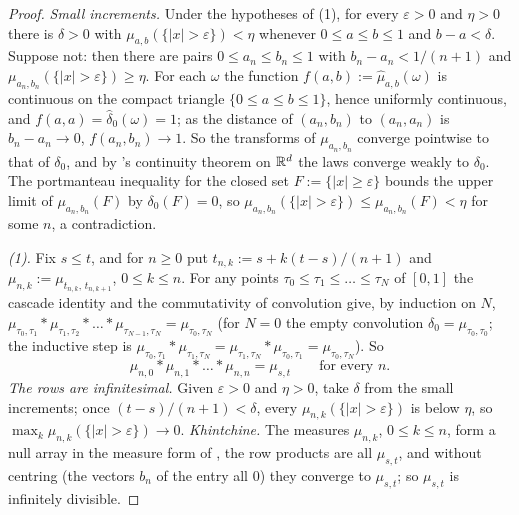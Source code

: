\begin{proof}
\leanok
\emph{Small increments.} Under the hypotheses of (1), for every $\varepsilon > 0$ and $\eta > 0$ there is
$\delta > 0$ with $\mu_{a,b}(\{|x| > \varepsilon\}) < \eta$ whenever $0 \le a \le b \le 1$ and
$b - a < \delta$. Suppose not: then there are pairs $0 \le a_n \le b_n \le 1$ with
$b_n - a_n < 1/(n+1)$ and $\mu_{a_n,b_n}(\{|x| > \varepsilon\}) \ge \eta$. For each $\omega$ the
function $f(a,b) := \widehat\mu_{a,b}(\omega)$ is continuous on the compact triangle
$\{0 \le a \le b \le 1\}$, hence uniformly continuous, and $f(a,a) = \widehat\delta_0(\omega) = 1$;
as the distance of $(a_n, b_n)$ to $(a_n, a_n)$ is $b_n - a_n \to 0$, $f(a_n, b_n) \to 1$. So the
transforms of $\mu_{a_n,b_n}$ converge pointwise to that of $\delta_0$, and by \Levy's continuity
theorem on $\mathbb{R}^d$ the laws converge weakly to $\delta_0$. The portmanteau inequality for the closed
set $F := \{|x| \ge \varepsilon\}$ bounds the upper limit of $\mu_{a_n,b_n}(F)$ by $\delta_0(F) = 0$, so
$\mu_{a_n,b_n}(\{|x| > \varepsilon\}) \le \mu_{a_n,b_n}(F) < \eta$ for some $n$, a contradiction.

\emph{(1).} Fix $s \le t$, and for $n \ge 0$ put $t_{n,k} := s + k(t - s)/(n+1)$ and
$\mu_{n,k} := \mu_{t_{n,k},\,t_{n,k+1}}$, $0 \le k \le n$. For any points
$\tau_0 \le \tau_1 \le \dots \le \tau_N$ of $[0,1]$ the cascade identity and the commutativity of
convolution give, by induction on $N$,
$\mu_{\tau_0,\tau_1} * \mu_{\tau_1,\tau_2} * \dots * \mu_{\tau_{N-1},\tau_N} = \mu_{\tau_0,\tau_N}$
(for $N = 0$ the empty convolution $\delta_0 = \mu_{\tau_0,\tau_0}$; the inductive step is
$\mu_{\tau_0,\tau_1} * \mu_{\tau_1,\tau_N} = \mu_{\tau_1,\tau_N} * \mu_{\tau_0,\tau_1} = \mu_{\tau_0,\tau_N}$). So
\[
  \mu_{n,0} * \mu_{n,1} * \dots * \mu_{n,n} = \mu_{s,t} \qquad \text{for every } n .
\]
\emph{The rows are infinitesimal.} Given $\varepsilon > 0$ and $\eta > 0$, take $\delta$ from the
small increments; once $(t - s)/(n+1) < \delta$, every $\mu_{n,k}(\{|x| > \varepsilon\})$ is below
$\eta$, so $\max_k \mu_{n,k}(\{|x| > \varepsilon\}) \to 0$. \emph{Khintchine.} The
measures $\mu_{n,k}$, $0 \le k \le n$, form a null array in the measure form of , the row
products are all $\mu_{s,t}$, and without centring (the vectors $b_n$ of the entry all $0$) they
converge to $\mu_{s,t}$; so $\mu_{s,t}$ is infinitely divisible.


\end{proof}
